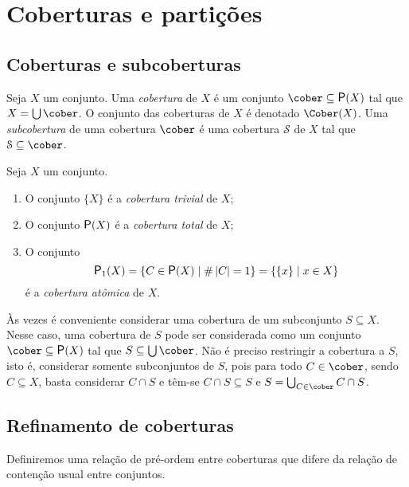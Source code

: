 \section{Coberturas e partições}

\subsection{Coberturas e subcoberturas}

\begin{definition}
Seja $X$ um conjunto. Uma \emph{cobertura} de $X$ é um conjunto $\cober \subseteq \p(X)$ tal que $X = \bigcup \cober$. O conjunto das coberturas de $X$ é denotado $\Cober(X)$.
Uma \emph{subcobertura} de uma cobertura $\cober$ é uma cobertura $\mathcal S$ de $X$ tal que $\mathcal S \subseteq \cober$.
\end{definition}

\begin{example}
Seja $X$ um conjunto.
	\begin{enumerate}
	\item O conjunto $\{X\}$ é a \emph{cobertura trivial} de $X$;
	\item O conjunto $\p(X)$ é a \emph{cobertura total} de $X$;
	\item O conjunto
		\begin{equation*}
		\p_1(X) = \set{C \in \p(X)}{\card{C}=1} = \set{\{x\}}{x \in X}
		\end{equation*}
	é a \emph{cobertura atômica} de $X$.
	\end{enumerate}
\end{example}

Às vezes é conveniente considerar uma cobertura de um subconjunto $S \subseteq X$. Nesse caso, uma cobertura de $S$ pode ser considerada como um conjunto $\cober \subseteq \p(X)$ tal que $S \subseteq \bigcup \cober$. Não é preciso restringir a cobertura a $S$, isto é, considerar somente subconjuntos de $S$, pois para todo $C \in \cober$, sendo $C \subseteq X$, basta considerar $C \cap S$ e têm-se $C \cap S \subseteq S$ e $S = \bigcup_{C \in \cober} C \cap S$.

\subsection{Refinamento de coberturas}

Definiremos uma relação de pré-ordem entre coberturas que difere da relação de contenção usual entre conjuntos.


